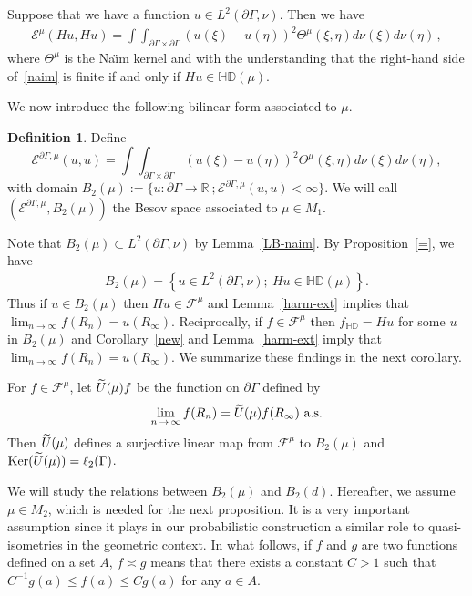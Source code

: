 \documentclass[10pt]{amsart}
\theoremstyle{definition}\newtheorem{defi}[theo]{Definition}\newtheorem{rema}[theo]{Remark}\newtheorem{exam}[theo]{Example}\newtheorem{exem}[theo]{Example}\newtheorem{nota}[theo]{Notation}
\newcommand{\ce}{\mathcal{E}}
\newcommand{\cf}{\mathcal{F}}
\newcommand{\br}{\mathbb{R}}
\newcommand{\bHD}{\mathbb{HD}}
\newcommand{\Ker}{\mathrm{Ker}}
\let\oldtilde\tilde
\renewcommand*{\tilde}[1]{\mathchoice{\widetilde{#1}}{\widetilde{#1}}{\oldtilde{#1}}{\oldtilde{#1}}}
\begin{document}
\begin{prop}\label{=}
Suppose that we have a function $u\in L^2(\partial\Gamma,\nu)$. Then we have
\begin{align}\label{naim}
\ce^\mu(Hu,Hu)=\int\int_{\partial\Gamma\times \partial\Gamma} (u(\xi)-u(\eta))^2\Theta^\mu(\xi,\eta) d\nu(\xi)d\nu(\eta)\,,
\end{align}
where $\Theta^\mu$ is the Na{\"\i}m kernel and with the understanding that the right-hand side of~\eqref{naim} is finite if and only if $Hu\in\bHD(\mu)$.
\end{prop}



We now introduce the following bilinear form associated to $\mu$.
\begin{defi}\label{emu}
Define
\[
\ce^{\partial\Gamma,\mu}(u,u)=\int\int_{\partial\Gamma\times \partial\Gamma}
(u(\xi)-u(\eta))^2 \Theta^\mu(\xi,\eta) d\nu(\xi)d\nu(\eta),
\]
with domain $B_2(\mu):=\{u:\partial \Gamma\rightarrow\br\ ;\ce^{\partial\Gamma,\mu}(u,u)<\infty\}$. We will call $(\ce^{\partial\Gamma,\mu},B_2(\mu))$ the Besov space associated to $\mu\in M_1$.
\end{defi}

Note that $B_2(\mu)\subset L^2(\partial\Gamma,\nu)$ by Lemma~\ref{LB-naim}. By Proposition~\ref{=}, we have
\begin{align}\label{besov=hu}
B_2(\mu)=\left\{u\in L^2(\partial\Gamma,\nu);\ Hu\in\bHD(\mu)\right\}.
\end{align}
Thus if $u\in B_2(\mu)$ then $Hu\in \cf^{\mu}$ and Lemma~\ref{harm-ext} implies that $\lim_{n\to\infty}f(R_n)=u(R_\infty)$. Reciprocally, if $f\in \cf^{\mu}$ then $f_{\bHD}=Hu$ for some $u$ in $B_2(\mu)$ and Corollary~\ref{new} and Lemma~\ref{harm-ext} imply that $\lim_{n\to\infty}f(R_n)=u(R_\infty)$. We summarize these findings in the next corollary.


\begin{coro}\label{new-new}
For $f\in\cf^{\mu}$, let $\tilde{U}(\mu)f$ be the function on $\partial\Gamma$ defined by
\[
\lim_{n\,\to\,\infty}f(R_n)=\tilde{U}(\mu)f(R_{\infty})\ \text{a.s.}
\]
Then $\tilde{U}(\mu)$ defines a surjective linear map from $\cf^{\mu}$ to $B_2(\mu)$ and $\Ker(\tilde{U}(\mu))=\ell_2(\Gamma)$.
\end{coro}


We will study the relations between $B_2(\mu)$ and $B_2(d)$. Hereafter, we assume $\mu\in M_2$, which is needed for the next proposition. It is a very important assumption since it plays in our probabilistic construction a similar role to quasi-isometries in the geometric context. In what follows, if $f$ and $g$ are two functions defined on a set $A$, $f\asymp g$ means that there exists a constant $C>1$ such that $C^{-1}g(a)\leq f(a)\leq Cg(a)$ for any $a\in A$.
\end{document}
